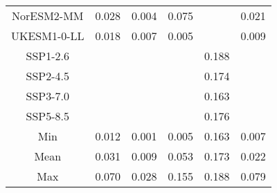 \begin{table*}[t]
\begin{tabular}{c|rrr|rr}
NorESM2-MM & 0.028 & 0.004 & 0.075 &  & 0.021 \\
UKESM1-0-LL & 0.018 & 0.007 & 0.005 &  & 0.009 \\
SSP1-2.6 &  &  &  & 0.188 &  \\
SSP2-4.5 &  &  &  & 0.174 &  \\
SSP3-7.0 &  &  &  & 0.163 &  \\
SSP5-8.5 &  &  &  & 0.176 &  \\
\midrule
Min & 0.012 & 0.001 & 0.005 & 0.163 & 0.007 \\
Mean & 0.031 & 0.009 & 0.053 & 0.173 & 0.022 \\
Max & 0.070 & 0.028 & 0.155 & 0.188 & 0.079 \\
\bottomrule
\end{tabular}
\end{table*}
